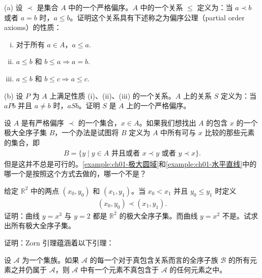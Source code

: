 \documentclass[../../main.tex]{subfiles}
\begin{document}
\begin{exercise}\label{exercise:ch01-极大原理-2}
(a) 设 $\prec$ 是集合 $A$ 中的一个严格偏序。$A$ 中的一个关系 $\leqslant$ 定义为：当 $a \prec b$ 或者 $a = b$ 时，$a \leqslant b$。证明这个关系具有下述称之为偏序公理（partial order axioms）的性质：
\begin{enumerate}[(i)]
\item 对于所有 $a \in A$，$a \leqslant a$.
\item $a \leqslant b$ 和 $b \leqslant a \Longrightarrow a = b$.
\item $a \leqslant b$ 和 $b \leqslant c \Longrightarrow a \leqslant c$.
\end{enumerate}

(b) 设 $P$ 为 $A$ 上满足性质 (i)、(ii)、(iii) 的一个关系。$A$ 上的关系 $S$ 定义为：当 $a P b$ 并且 $a \neq b$ 时，$a S b$。证明 $S$ 是 $A$ 上的一个严格偏序。
\end{exercise}

\begin{exercise}\label{exercise:ch01-极大原理-3}
设 $A$ 是有严格偏序 $\prec$ 的一个集合，$x \in A$。如果我们想找出 $A$ 的包含 $x$ 的一个极大全序子集 $B$，一个办法是试图将 $B$ 定义为 $A$ 中所有可与 $x$ 比较的那些元素的集合，即
\begin{align*}
B = \{y \mid y \in A \text{ 并且或者 } x \prec y \text{ 或者 } y \prec x\}.
\end{align*}
但是这并不总是可行的。\cref{example:ch01-极大圆域}和\cref{example:ch01-水平直线}中的哪一个是按照这个方式去做的，哪一个不是？
\end{exercise}

\begin{exercise}\label{exercise:ch01-极大原理-4}
给定 $\mathbb{R}^{2}$ 中的两点 $(x_{0}, y_{0})$ 和 $(x_{1}, y_{1})$。当 $x_{0} < x_{1}$ 并且 $y_{0} \leqslant y_{1}$ 时定义
\begin{align*}
(x_{0}, y_{0}) \prec (x_{1}, y_{1}).
\end{align*}
证明：曲线 $y = x^{3}$ 与 $y = 2$ 都是 $\mathbb{R}^{2}$ 的极大全序子集。而曲线 $y = x^{2}$ 不是。试求出所有极大全序子集。
\end{exercise}

\begin{exercise}\label{exercise:ch01-极大原理-5}
证明：Zorn 引理蕴涵着以下引理：

\begin{lemma}[Kuratowski 引理]\label{lemma:ch01-Kuratowski}
设 $\mathcal{A}$ 为一个集族。如果 $\mathcal{A}$ 的每一个对于真包含关系而言的全序子族 $\mathcal{B}$ 的所有元素之并仍属于 $\mathcal{A}$，则 $\mathcal{A}$ 中有一个元素不真包含于 $\mathcal{A}$ 的任何元素之中。
\end{lemma}
\end{exercise}
\end{document}

